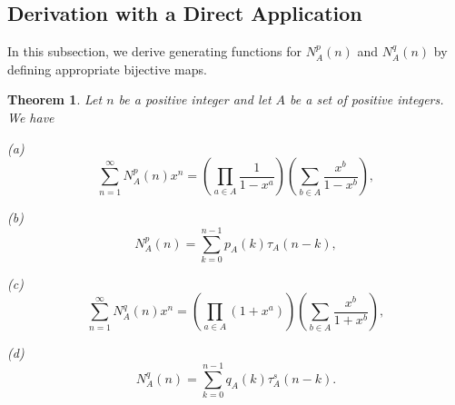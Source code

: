 \documentclass[11pt]{article}
\newtheorem{theorem}{Theorem}
\begin{document}
\subsection{ Derivation with a Direct Application}
In this subsection, we derive generating functions for $N^p_A(n)$ and $N^q_A(n)$ by defining appropriate bijective maps. 
\begin{theorem}\label{iden-1}
Let $n$ be a positive integer and let $A$ be a set of positive integers. We have
\begin{description}
\item{(a)}
\begin{equation}
\sum_{n=1}^{\infty}N^p_A(n)x^n=\left(\prod_{a\in A}\frac{1}{1-x^a}\right)\left(\sum_{b\in A}\frac{x^b}{1-x^b}\right),
\end{equation}
\item{(b)}
\begin{equation}
N^p_A(n)=\sum_{k=0}^{n-1}p_A(k)\tau_A(n-k),
\end{equation}
\item{(c)}
\begin{equation}
\sum_{n=1}^{\infty}N^q_A(n)x^n=\left(\prod_{a\in A}(1+x^a)\right)\left(\sum_{b\in A}\frac{x^b}{1+x^b}\right),
\end{equation}
\item{(d)}
\begin{equation}
N^q_A(n)=\sum_{k=0}^{n-1}q_A(k)\tau_A^s(n-k).
\end{equation}
\end{description}
\end{theorem}
\end{document}
